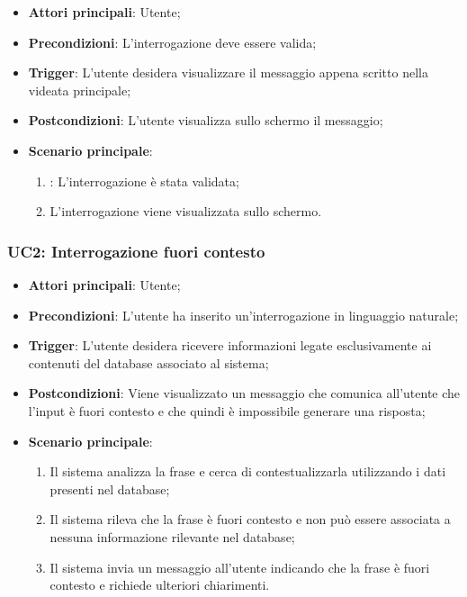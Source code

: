 \hypertarget{UC1.4}{}
\begin{itemize}
    \item \textbf{Attori principali}: Utente;
    \item \textbf{Precondizioni}: L'interrogazione deve essere valida;
    \item \textbf{Trigger}: L'utente desidera visualizzare il messaggio appena scritto nella videata principale;
    \item \textbf{Postcondizioni}: L'utente visualizza sullo schermo il messaggio;
    \item \textbf{Scenario principale}:
    \begin{enumerate}
        \item {}: L'interrogazione è stata validata;
        \item L'interrogazione viene visualizzata sullo schermo.
    \end{enumerate}
\end{itemize}


\hypertarget{UC2}{}
\subsubsection{UC2: Interrogazione fuori contesto}

\begin{itemize}
    \item \textbf{Attori principali}: Utente;
    \item \textbf{Precondizioni}: L'utente ha inserito un'interrogazione in linguaggio naturale;
    \item \textbf{Trigger}: L'utente desidera ricevere informazioni legate esclusivamente ai contenuti del database associato al sistema;
    \item \textbf{Postcondizioni}: Viene visualizzato un messaggio che comunica all'utente che l'input è fuori contesto e che quindi è impossibile generare una risposta;
    \item \textbf{Scenario principale}:
    \begin{enumerate}
        \item Il sistema analizza la frase e cerca di contestualizzarla utilizzando i dati presenti nel database;
        \item Il sistema rileva che la frase è fuori contesto e non può essere associata a nessuna informazione rilevante nel database;
        \item Il sistema invia un messaggio all'utente indicando che la frase è fuori contesto e richiede ulteriori chiarimenti.
    \end{enumerate}
\end{itemize}


